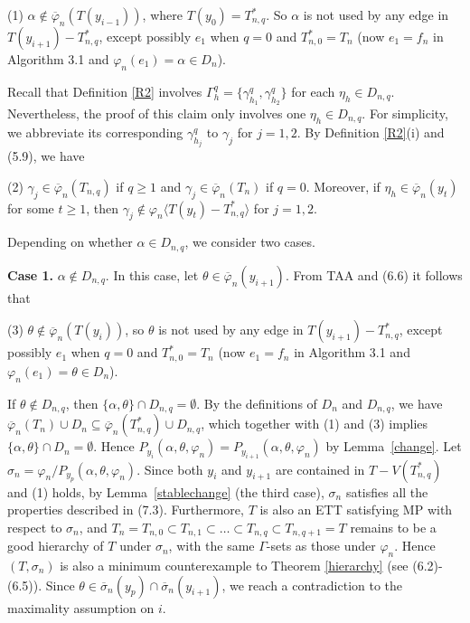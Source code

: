 \documentclass[11pt]{article}
\newcommand{\phibar}{\overline{\varphi}}
\begin{document}
(1) $\alpha \notin \overline{\varphi}_n(T(y_{i-1}))$, where $T(y_0)=T_{n,q}^*$. So $\alpha$ is not used by any edge in 
$T(y_{i+1}) -  T_{n,q}^*$, except possibly $e_1$ when $q=0$ and $T_{n,0}^*=T_n$ (now $e_1=f_n$ in Algorithm 3.1 and 
$\varphi_n(e_1)=\alpha \in D_n$). 

Recall that Definition \ref{R2} involves $\Gamma^{q}_h=\{\gamma^{q}_{h_1}, \gamma^{q}_{h_2}\}$ for each $\eta_h\in 
D_{n,q}$. Nevertheless, the proof of this claim only involves one $\eta_h\in D_{n,q}$. For simplicity, we abbreviate 
its corresponding $\gamma^{q}_{h_j}$ to $\gamma_{j}$ for $j=1,2$. By Definition \ref{R2}(i) and (5.9), we have 

(2)  $\gamma_{j}\in \phibar_n (T_{n,q})$ if $q\geq 1$ and $\gamma_{j}\in \phibar_n(T_{n})$ if $q=0$.  
Moreover, if $\eta_h \in \overline{\varphi}_n(y_t)$ for some $t\ge 1$, then $\gamma_{j}\notin \varphi_n 
\langle T(y_t)-T_{n,q}^* \rangle$ for $j=1,2$. 

Depending on whether $\alpha \in D_{n,q}$, we consider two cases.

{\bf Case 1.} $\alpha\notin D_{n,q}$. In this case, let $\theta\in\overline{\varphi}_n(y_{i+1})$. From TAA and (6.6)
it follows that 

(3) $\theta \notin \overline{\varphi}_n(T(y_i))$, so $\theta$ is not used by any edge in $T(y_{i+1}) -  T_{n,q}^*$, 
except possibly $e_1$ when $q=0$ and $T_{n,0}^*=T_n$ (now $e_1=f_n$ in Algorithm 3.1 and $\varphi_n(e_1)=\theta \in D_n$).  

If $\theta\notin D_{n,q}$,  then $\{\alpha, \theta\}\cap D_{n,q} = \emptyset$. By the definitions of $D_n$ and
$D_{n,q}$, we have $\overline{\varphi}_n(T_n) \cup D_n \subseteq  \overline{\varphi}_n(T_{n,q}^*) \cup D_{n,q}$, 
which together with (1) and (3) implies $\{\alpha, \theta\}\cap D_{n} = \emptyset$.  Hence
$P_{y_{i}}(\alpha,\theta,\varphi_n)=P_{y_{i+1}}(\alpha,\theta,\varphi_n)$ by Lemma~\ref{change}. 
Let $\sigma_n=\varphi_n/P_{y_{p}}(\alpha,\theta,\varphi_n)$. Since both $y_i$ and $y_{i+1}$ are contained in $T-V(T_{n,q}^*)$
and (1) holds, by Lemma~\ref{stablechange} (the third case), $\sigma_n$ satisfies all the properties described in
(7.3).  Furthermore, $T$ is also an ETT satisfying MP with respect to $\sigma_n$, and $T_n=T_{n,0} \subset T_{n,1}
\subset \ldots \subset T_{n,q}\subset T_{n,q+1}=T$ remains to be a good hierarchy of $T$ under $\sigma_n$, with the 
same $\Gamma$-sets as those under $\varphi_n$. Hence $(T, \sigma_n)$ is also a minimum counterexample to Theorem 
\ref{hierarchy} (see (6.2)-(6.5)). Since $\theta\in\overline{\sigma}_n(y_p)\cap\overline{\sigma}_n(y_{i+1})$, 
we reach a contradiction to the maximality assumption on $i$.
\end{document}
